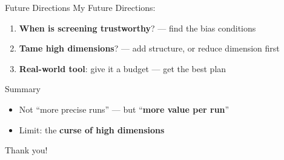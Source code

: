 ﻿\documentclass[10pt]{beamer}
\begin{document}
\begin{frame}{Future Directions}
  My Future Directions:
  \begin{enumerate}
    \item \textbf{When is screening trustworthy}? --- find the bias conditions
    \item \textbf{Tame high dimensions}? --- add structure, or reduce dimension first
    \item \textbf{Real-world tool}: give it a budget --- get the best plan
  \end{enumerate}
\end{frame}

\begin{frame}{Summary}
  \begin{itemize}
    \item Not ``more precise runs'' --- but ``\textbf{more value per run}''
    \item Limit: the \textbf{curse of high dimensions}
  \end{itemize}
\end{frame}

\begin{frame}[standout]
  Thank you!
\end{frame}
\end{document}

